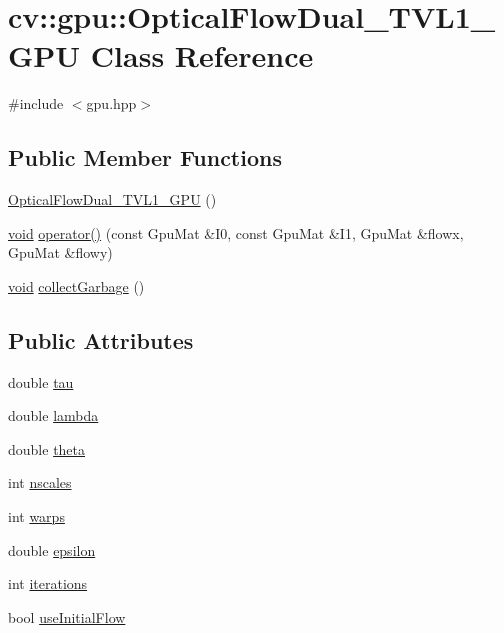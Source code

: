 \hypertarget{classcv_1_1gpu_1_1OpticalFlowDual__TVL1__GPU}{\section{cv\-:\-:gpu\-:\-:Optical\-Flow\-Dual\-\_\-\-T\-V\-L1\-\_\-\-G\-P\-U Class Reference}
\label{classcv_1_1gpu_1_1OpticalFlowDual__TVL1__GPU}
}


{\ttfamily \#include $<$gpu.\-hpp$>$}

\subsection*{Public Member Functions}
\begin{DoxyCompactItemize}
\item 
\hyperlink{classcv_1_1gpu_1_1OpticalFlowDual__TVL1__GPU_aa2c2129efcaf4203f7a21fc07559168b}{Optical\-Flow\-Dual\-\_\-\-T\-V\-L1\-\_\-\-G\-P\-U} ()
\item 
\hyperlink{legacy_8hpp_a8bb47f092d473522721002c86c13b94e}{void} \hyperlink{classcv_1_1gpu_1_1OpticalFlowDual__TVL1__GPU_a3ea672905dafd10d47173df36662eab5}{operator()} (const Gpu\-Mat \&I0, const Gpu\-Mat \&I1, Gpu\-Mat \&flowx, Gpu\-Mat \&flowy)
\item 
\hyperlink{legacy_8hpp_a8bb47f092d473522721002c86c13b94e}{void} \hyperlink{classcv_1_1gpu_1_1OpticalFlowDual__TVL1__GPU_a69950aaf9df6ebeafa281d7544f12247}{collect\-Garbage} ()
\end{DoxyCompactItemize}
\subsection*{Public Attributes}
\begin{DoxyCompactItemize}
\item 
double \hyperlink{classcv_1_1gpu_1_1OpticalFlowDual__TVL1__GPU_a4c50ab56c6ffda2331479b5bafd5c267}{tau}
\item 
double \hyperlink{classcv_1_1gpu_1_1OpticalFlowDual__TVL1__GPU_abedc407f2066391c89214e149f35eb82}{lambda}
\item 
double \hyperlink{classcv_1_1gpu_1_1OpticalFlowDual__TVL1__GPU_ad9b6b7b90dbe73bb780c51f2a0d90ecc}{theta}
\item 
int \hyperlink{classcv_1_1gpu_1_1OpticalFlowDual__TVL1__GPU_ac17a62999ac19bed123d8f6bb4f5336d}{nscales}
\item 
int \hyperlink{classcv_1_1gpu_1_1OpticalFlowDual__TVL1__GPU_a7a77936582247a180bf0cfbb55f7875c}{warps}
\item 
double \hyperlink{classcv_1_1gpu_1_1OpticalFlowDual__TVL1__GPU_a16f4286555465d7da1fb29842f34443b}{epsilon}
\item 
int \hyperlink{classcv_1_1gpu_1_1OpticalFlowDual__TVL1__GPU_a27a4a49f41a1f438e9c6ba69dc13b645}{iterations}
\item 
bool \hyperlink{classcv_1_1gpu_1_1OpticalFlowDual__TVL1__GPU_af17da8e422347e60a6a8968b566e3634}{use\-Initial\-Flow}
\end{DoxyCompactItemize}


